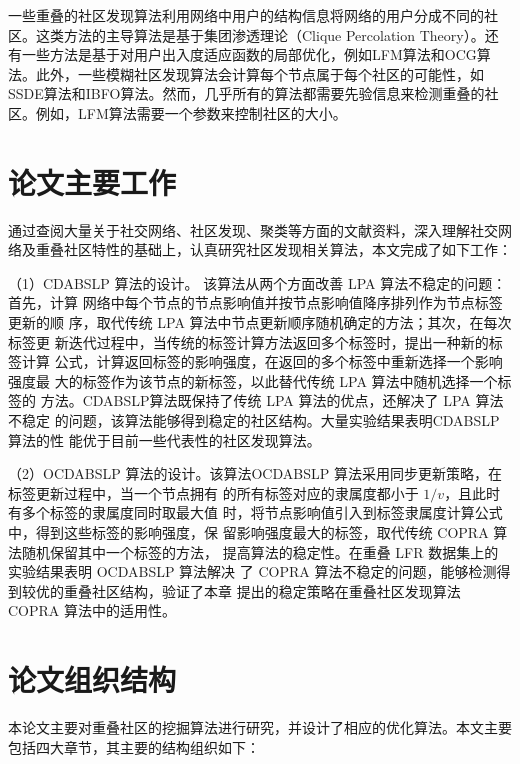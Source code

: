 一些重叠的社区发现算法利用网络中用户的结构信息将网络的用户分成不同的社区。这类方法的主导算法是基于集团渗透理论（Clique Percolation Theory）\cite{Palla2005Uncovering}。还有一些方法是基于对用户出入度适应函数的局部优化，例如LFM算法\cite{Lancichinetti2012Detecting}和OCG算法\cite{Becker2012Multifunctional}。此外，一些模糊社区发现算法会计算每个节点属于每个社区的可能性，如SSDE算法\cite{Magdon2010SSDE}和IBFO算法\cite{Lei2013Clustering}。然而，几乎所有的算法都需要先验信息来检测重叠的社区。例如，LFM算法需要一个参数来控制社区的大小。

\section{论文主要工作}

通过查阅大量关于社交网络、社区发现、聚类等方面的文献资料，深入理解社交网络及重叠社区特性的基础上，认真研究社区发现相关算法，本文完成了如下工作：

（1）CDABSLP 算法的设计。
该算法从两个方面改善 LPA 算法不稳定的问题：首先，计算
网络中每个节点的节点影响值并按节点影响值降序排列作为节点标签更新的顺
序，取代传统 LPA 算法中节点更新顺序随机确定的方法；其次，在每次标签更
新迭代过程中，当传统的标签计算方法返回多个标签时，提出一种新的标签计算
公式，计算返回标签的影响强度，在返回的多个标签中重新选择一个影响强度最
大的标签作为该节点的新标签，以此替代传统 LPA 算法中随机选择一个标签的
方法。CDABSLP算法既保持了传统 LPA 算法的优点，还解决了 LPA 算法不稳定
的问题，该算法能够得到稳定的社区结构。大量实验结果表明CDABSLP算法的性
能优于目前一些代表性的社区发现算法。 

（2）OCDABSLP 算法的设计。该算法OCDABSLP 算法采用同步更新策略，在标签更新过程中，当一个节点拥有
的所有标签对应的隶属度都小于 $1/v$，且此时有多个标签的隶属度同时取最大值
时，将节点影响值引入到标签隶属度计算公式中，得到这些标签的影响强度，保
留影响强度最大的标签，取代传统 COPRA 算法随机保留其中一个标签的方法，
提高算法的稳定性。在重叠 LFR 数据集上的实验结果表明 OCDABSLP 算法解决
了 COPRA 算法不稳定的问题，能够检测得到较优的重叠社区结构，验证了本章
提出的稳定策略在重叠社区发现算法 COPRA 算法中的适用性。



\section{论文组织结构}

本论文主要对重叠社区的挖掘算法进行研究，并设计了相应的优化算法。本文主要包括四大章节，其主要的结构组织如下：

